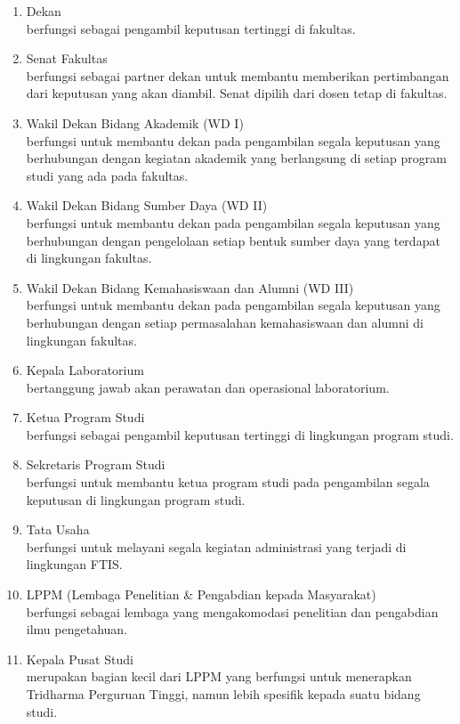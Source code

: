 \begin{enumerate}
	\item Dekan \\
	berfungsi sebagai pengambil keputusan tertinggi di fakultas.
	\item Senat Fakultas \\
	berfungsi sebagai partner dekan untuk membantu memberikan pertimbangan dari keputusan yang akan diambil. Senat dipilih dari dosen tetap di fakultas.
	\item Wakil Dekan Bidang Akademik (WD I)\\
	berfungsi untuk membantu dekan pada pengambilan segala keputusan yang berhubungan dengan kegiatan akademik yang berlangsung di setiap program studi yang ada pada fakultas.
	\item Wakil Dekan Bidang Sumber Daya (WD II)\\
	berfungsi untuk membantu dekan pada pengambilan segala keputusan yang berhubungan dengan pengelolaan setiap bentuk sumber daya yang terdapat di lingkungan fakultas.
	\item Wakil Dekan Bidang Kemahasiswaan dan Alumni (WD III)\\
	berfungsi untuk membantu dekan pada pengambilan segala keputusan yang berhubungan dengan setiap permasalahan kemahasiswaan dan alumni di lingkungan fakultas.
	\item Kepala Laboratorium \\
	bertanggung jawab akan perawatan dan operasional laboratorium.
	\item Ketua Program Studi \\
	berfungsi sebagai pengambil keputusan tertinggi di lingkungan program studi.
	\item Sekretaris Program Studi \\
	berfungsi untuk membantu ketua program studi pada pengambilan segala keputusan di lingkungan program studi.
	\item Tata Usaha \\
	berfungsi untuk melayani segala kegiatan administrasi yang terjadi di lingkungan FTIS.
	\item LPPM (Lembaga Penelitian \& Pengabdian kepada Masyarakat)\\
	berfungsi sebagai lembaga yang mengakomodasi penelitian dan pengabdian ilmu pengetahuan.
	\item Kepala Pusat Studi \\
	merupakan bagian kecil dari LPPM yang berfungsi untuk menerapkan Tridharma Perguruan Tinggi, namun lebih spesifik kepada suatu bidang studi.
\end{enumerate}

